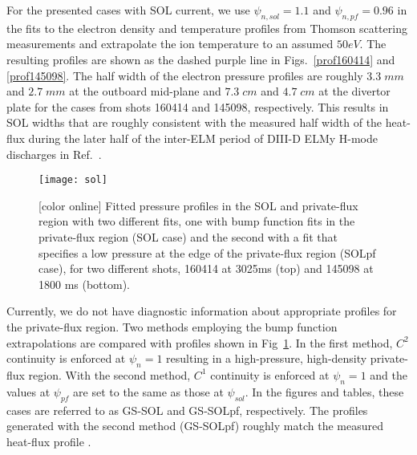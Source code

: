 \documentclass[english,aps,superscriptaddress,showkeys,showpacs,prepri,twocolumn]{revtex4}
\begin{document}
For the presented cases with SOL current, we use $\psi_{n,sol}=1.1$ and 
$\psi_{n,pf}=0.96$ in the fits to the electron density and temperature profiles from
Thomson scattering measurements and extrapolate the ion temperature to an
assumed $50eV$.  The resulting profiles are shown as the dashed purple line
in Figs.~\ref{prof160414} and \ref{prof145098}.  The half width of the electron
pressure profiles are roughly $3.3\;mm$ and $2.7\;mm$ at the outboard mid-plane
and $7.3\;cm$ and $4.7\;cm$ at the divertor plate for the cases from shots
160414 and 145098, respectively.  This results in SOL widths that are roughly
consistent with the measured half width of the heat-flux during the later half
of the inter-ELM period of DIII-D ELMy H-mode discharges in Ref.~\cite{eich13}.

\begin{figure}
\begin{center}
\texttt{[image: sol]}
\caption{ [color online]
Fitted pressure profiles in the SOL and private-flux region with two different
fits, one with bump function fits in the private-flux region (SOL case) and the
second with a fit that specifies a low pressure at the edge of the private-flux
region (SOLpf case), for two different shots, 160414 at 3025ms (top) and 145098
at 1800 ms (bottom).
}
\label{solProfs}
\end{center}
\end{figure}

Currently, we do not have diagnostic information about appropriate profiles for
the private-flux region. Two methods employing the bump function extrapolations
are compared with profiles shown in Fig~\ref{solProfs}. In the first method,
$C^2$ continuity is enforced at $\psi_n=1$ resulting in a high-pressure,
high-density private-flux region. With the second method, $C^1$ continuity is
enforced at $\psi_n=1$ and the values at $\psi_{pf}$ are set to the same as
those at $\psi_{sol}$. In the figures and tables, these cases are referred 
to as GS-SOL and GS-SOLpf, respectively. The profiles generated with the
second method (GS-SOLpf) roughly match the measured heat-flux profile \cite{Groebner_JRT,eich13}. 
\end{document}

